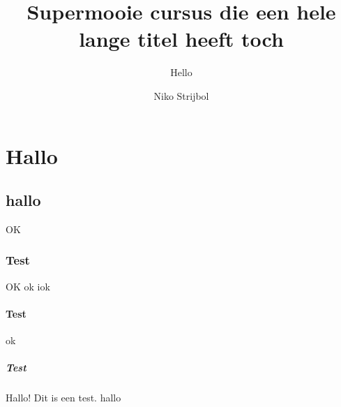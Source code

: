 \documentclass[11pt,dutch,campus=default,faculty=ea,layout=all]{ugentreport2016}
\begin{document}
    \author{Niko Strijbol}
    \title{Supermooie cursus die een hele lange titel heeft toch}
    \subtitle{Hello}
    \address{%
        Ter Puttetstraat 8 \\
        8940 Wervik
    }

    \maketitle

    \tableofcontents

    \part{Hallo}
    \chapter{hallo}
    OK
    \section{Test}
    OK
    ok
    iok
    \subsection{Test}
    ok
    \subsubsection{Test}

    Hallo! Dit is een test.
    \newpage
    hallo

    \newpage

\end{document}
